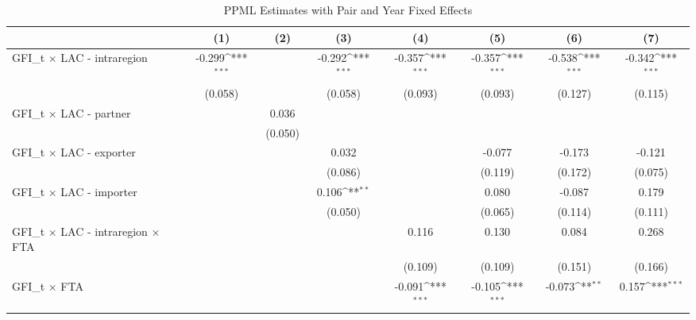\begin{table}[htbp]\centering
\def\sym#1{\ifmmode^{#1}\else\(^{#1}\)\fi}
\caption{PPML Estimates with Pair and Year Fixed Effects}
\begin{tabular}{l*{7}{c}}
\hline\hline
          &\multicolumn{1}{c}{(1)}         &\multicolumn{1}{c}{(2)}         &\multicolumn{1}{c}{(3)}         &\multicolumn{1}{c}{(4)}         &\multicolumn{1}{c}{(5)}         &\multicolumn{1}{c}{(6)}         &\multicolumn{1}{c}{(7)}         \\
\hline
GFI\_t × LAC - intraregion&   -0.299\sym{***}&                  &   -0.292\sym{***}&   -0.357\sym{***}&   -0.357\sym{***}&   -0.538\sym{***}&   -0.342\sym{***}\\
          &  (0.058)         &                  &  (0.058)         &  (0.093)         &  (0.093)         &  (0.127)         &  (0.115)         \\
[1em]
GFI\_t × LAC - partner&                  &    0.036         &                  &                  &                  &                  &                  \\
          &                  &  (0.050)         &                  &                  &                  &                  &                  \\
[1em]
GFI\_t × LAC - exporter&                  &                  &    0.032         &                  &   -0.077         &   -0.173         &   -0.121         \\
          &                  &                  &  (0.086)         &                  &  (0.119)         &  (0.172)         &  (0.075)         \\
[1em]
GFI\_t × LAC - importer&                  &                  &    0.106\sym{**} &                  &    0.080         &   -0.087         &    0.179         \\
          &                  &                  &  (0.050)         &                  &  (0.065)         &  (0.114)         &  (0.111)         \\
[1em]
GFI\_t × LAC - intraregion × FTA&                  &                  &                  &    0.116         &    0.130         &    0.084         &    0.268         \\
          &                  &                  &                  &  (0.109)         &  (0.109)         &  (0.151)         &  (0.166)         \\
[1em]
GFI\_t × FTA&                  &                  &                  &   -0.091\sym{***}&   -0.105\sym{***}&   -0.073\sym{**} &    0.157\sym{***}\\

\end{tabular}
\end{table}
